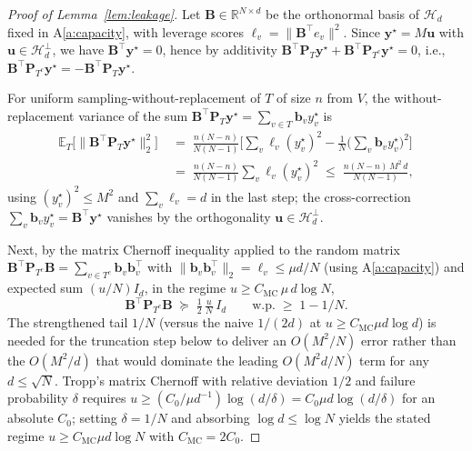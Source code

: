 \documentclass[11pt,a4paper]{article}
\theoremstyle{plain}
\theoremstyle{definition}
\theoremstyle{remark}
\newcommand{\by}{\mathbf{y}}
\newcommand{\bP}{\mathbf{P}}
\newcommand{\bB}{\mathbf{B}}
\newcommand{\bu}{\mathbf{u}}
\newcommand{\bb}{\mathbf{b}}
\newcommand{\E}{\mathbb{E}}
\newcommand{\R}{\mathbb{R}}
\newcommand{\Hcal}{\mathcal{H}}
\begin{document}
\begin{proof}[Proof of Lemma~\ref{lem:leakage}]
Let $\bB \in \R^{N \times d}$ be the orthonormal basis of $\Hcal_d$
fixed in A\ref{a:capacity}, with leverage scores $\ell_v = \|\bB^\top
e_v\|^2$. Since $\by^\star = M\bu$ with $\bu \in \Hcal_d^\perp$, we
have $\bB^\top \by^\star = 0$, hence by additivity $\bB^\top\bP_T
\by^\star + \bB^\top \bP_{T^c}\by^\star = 0$, i.e.,
$\bB^\top\bP_{T^c}\by^\star = -\bB^\top\bP_T\by^\star$.

For uniform sampling-without-replacement of $T$ of size $n$ from
$V$, the without-replacement variance of the sum $\bB^\top\bP_T
\by^\star = \sum_{v \in T} \bb_v y^\star_v$ is
\begin{align*}
    \E_T\!\big[\|\bB^\top \bP_T \by^\star\|_2^2\big]
    &\;=\; \frac{n(N-n)}{N(N-1)}
        \bigg[\sum_v \ell_v (y^\star_v)^2 - \frac{1}{N}\Big(\sum_v \bb_v y^\star_v\Big)^{\!2}\bigg]\\
    &\;=\; \frac{n(N-n)}{N(N-1)}\sum_v \ell_v (y^\star_v)^2
        \;\le\; \frac{n(N-n)\, M^2\, d}{N(N-1)},
\end{align*}
using $(y^\star_v)^2 \le M^2$ and $\sum_v \ell_v = d$ in the last
step; the cross-correction $\sum_v \bb_v y^\star_v = \bB^\top
\by^\star$ vanishes by the orthogonality $\bu \in \Hcal_d^\perp$.

Next, by the matrix Chernoff inequality
\citep[][Theorem~1.1]{Tropp2015} applied to the random matrix
$\bB^\top \bP_{T^c}\bB = \sum_{v \in T^c} \bb_v\bb_v^\top$ with
$\|\bb_v\bb_v^\top\|_2 = \ell_v \le \mu d/N$ (using A\ref{a:capacity})
and expected sum $(u/N) I_d$, in the regime $u \ge C_\mathrm{MC}\,
\mu\, d \log N$,
\begin{equation}
    \bB^\top \bP_{T^c}\bB \;\succeq\; \tfrac{1}{2}\, \tfrac{u}{N}\, I_d
    \qquad\text{w.p.}\;\ge\; 1 - 1/N.
    \label{eq:chernoff-event}
\end{equation}
The strengthened tail $1/N$ (versus the naive $1/(2d)$ at
$u \ge C_\mathrm{MC}\mu d\log d$) is needed for the truncation
step below to deliver an $O(M^2/N)$ error rather than the
$O(M^2/d)$ that would dominate the leading $O(M^2 d/N)$ term
for any $d \le \sqrt N$.  Tropp's matrix Chernoff with relative
deviation $1/2$ and failure probability $\delta$ requires
$u \ge (C_0/\mu d^{-1})\log(d/\delta) = C_0 \mu d \log(d/\delta)$
for an absolute $C_0$; setting $\delta = 1/N$ and absorbing
$\log d \le \log N$ yields the stated regime $u \ge C_\mathrm{MC}
\mu d \log N$ with $C_\mathrm{MC} = 2 C_0$.


\end{proof}
\end{document}
